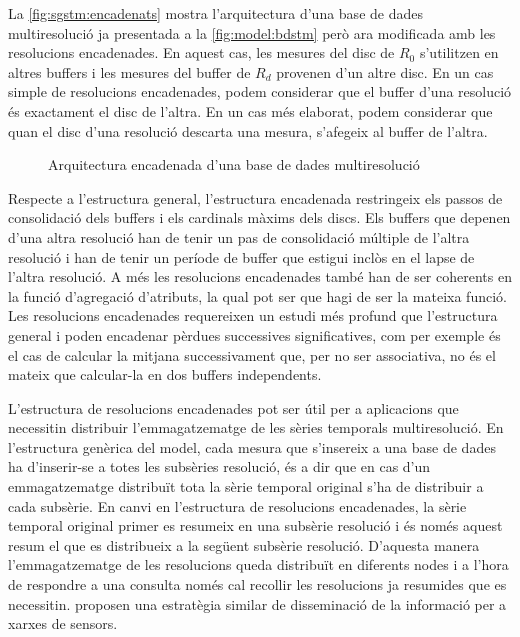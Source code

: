 La \autoref{fig:sgstm:encadenats} mostra l'arquitectura d'una base de
dades multiresolució ja presentada a la \autoref{fig:model:bdstm} però
ara modificada amb les resolucions encadenades.  En aquest cas, les
mesures del disc de $R_0$ s'utilitzen en altres buffers i les mesures
del buffer de $R_d$ provenen d'un altre disc. En un cas simple de
resolucions encadenades, podem considerar que el buffer d'una
resolució és exactament el disc de l'altra. En un cas més elaborat,
podem considerar que quan el disc d'una resolució descarta una mesura,
s'afegeix al buffer de l'altra.


\begin{figure}[tp]
  \centering
  
  \caption{Arquitectura encadenada d'una base de dades multiresolució}
  \label{fig:sgstm:encadenats}
\end{figure}


Respecte a l'estructura general, l'estructura encadenada restringeix
els passos de consolidació dels buffers i els cardinals màxims dels
discs. Els buffers que depenen d'una altra resolució han de tenir un
pas de consolidació múltiple de l'altra resolució i han de tenir un
període de buffer que estigui inclòs en el lapse de l'altra resolució.
A més les resolucions encadenades també han de ser coherents en la
funció d'agregació d'atributs, la qual pot ser que hagi de ser la
mateixa funció. Les resolucions encadenades requereixen un estudi més
profund que l'estructura general i poden encadenar pèrdues successives
significatives, com per exemple és el cas de calcular la mitjana
successivament que, per no ser associativa, no és el mateix que
calcular-la en dos buffers independents.


L'estructura de resolucions encadenades pot ser útil per a aplicacions
que necessitin distribuir l'emmagatzematge de les sèries temporals
multiresolució.  En l'estructura genèrica del model, cada mesura que
s'insereix a una base de dades ha d'inserir-se a totes les subsèries
resolució, és a dir que en cas d'un emmagatzematge distribuït tota la
sèrie temporal original s'ha de distribuir a cada subsèrie.  En canvi
en l'estructura de resolucions encadenades, la sèrie temporal original
primer es resumeix en una subsèrie resolució i és només aquest resum
el que es distribueix a la següent subsèrie resolució.  D'aquesta
manera l'emmagatzematge de les resolucions queda distribuït en
diferents nodes i a l'hora de respondre a una consulta només cal
recollir les resolucions ja resumides que es necessitin.
\textcite{deligiannakis07} proposen una estratègia similar de
disseminació de la informació per a xarxes de sensors.


